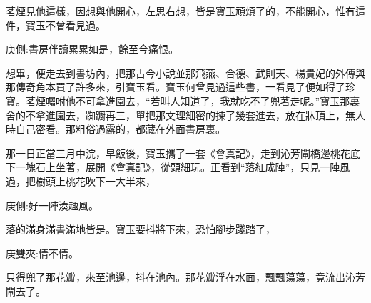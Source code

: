 \begin{parag}
    茗煙見他這樣，因想與他開心，左思右想，皆是寶玉頑煩了的，不能開心，惟有這件，寶玉不曾看見過。\begin{note}庚側:書房伴讀累累如是，餘至今痛恨。\end{note}想畢，便走去到書坊內，把那古今小說並那飛燕、合德、武則天、楊貴妃的外傳與那傳奇角本買了許多來，引寶玉看。寶玉何曾見過這些書，一看見了便如得了珍寶。茗煙囑咐他不可拿進園去，“若叫人知道了，我就吃不了兜著走呢。”寶玉那裏舍的不拿進園去，踟躕再三，單把那文理細密的揀了幾套進去，放在牀頂上，無人時自己密看。那粗俗過露的，都藏在外面書房裏。
\end{parag}


\begin{parag}
    那一日正當三月中浣，早飯後，寶玉攜了一套《會真記》，走到沁芳閘橋邊桃花底下一塊石上坐著，展開《會真記》，從頭細玩。正看到“落紅成陣”，只見一陣風過，把樹頭上桃花吹下一大半來，\begin{note}庚側:好一陣湊趣風。\end{note}落的滿身滿書滿地皆是。寶玉要抖將下來，恐怕腳步踐踏了，\begin{note}庚雙夾:情不情。\end{note}只得兜了那花瓣，來至池邊，抖在池內。那花瓣浮在水面，飄飄蕩蕩，竟流出沁芳閘去了。
\end{parag}


